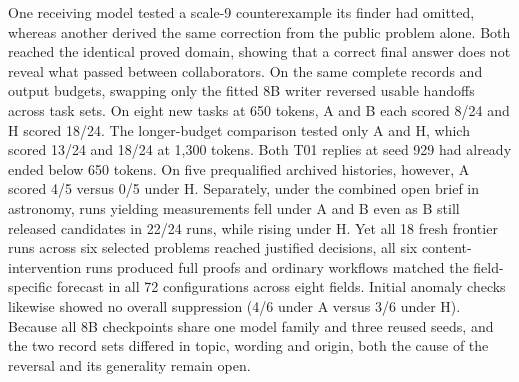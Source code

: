 One receiving model tested a scale-9 counterexample its finder had omitted, whereas another derived the same correction from the public problem alone. Both reached the identical proved domain, showing that a correct final answer does not reveal what passed between collaborators. On the same complete records and output budgets, swapping only the fitted 8B writer reversed usable handoffs across task sets. On eight new tasks at 650 tokens, A and B each scored 8/24 and H scored 18/24. The longer-budget comparison tested only A and H, which scored 13/24 and 18/24 at 1,300 tokens. Both T01 replies at seed 929 had already ended below 650 tokens. On five prequalified archived histories, however, A scored 4/5 versus 0/5 under H. Separately, under the combined open brief in astronomy, runs yielding measurements fell under A and B even as B still released candidates in 22/24 runs, while rising under H. Yet all 18 fresh frontier runs across six selected problems reached justified decisions, all six content-intervention runs produced full proofs and ordinary workflows matched the field-specific forecast in all 72 configurations across eight fields. Initial anomaly checks likewise showed no overall suppression (4/6 under A versus 3/6 under H). Because all 8B checkpoints share one model family and three reused seeds, and the two record sets differed in topic, wording and origin, both the cause of the reversal and its generality remain open.

